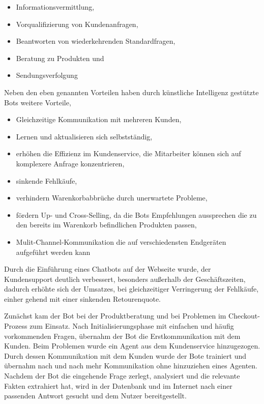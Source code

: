 \begin{itemize}
	\item Informationsvermittlung,
	\item Vorqualifizierung von Kundenanfragen,
	\item Beantworten von wiederkehrenden Standardfragen,
	\item Beratung zu Produkten und
	\item Sendungsverfolgung
\end{itemize} 

Neben den eben genannten Vorteilen haben durch künstliche Intelligenz gestützte Bots weitere Vorteile,

\begin{itemize}
	\item Gleichzeitige Kommunikation mit mehreren Kunden,
	\item Lernen und aktualisieren sich selbstständig,
	\item erhöhen die Effizienz im Kundenservice, die Mitarbeiter können sich auf komplexere Anfrage konzentrieren,
	\item sinkende Fehlkäufe,
	\item verhindern Warenkorbabbrüche durch unerwartete Probleme,
	\item fördern Up- und Cross-Selling, da die Bots Empfehlungen aussprechen die zu den bereits im Warenkorb befindlichen Produkten passen,
	\item Mulit-Channel-Kommunikation die auf verschiedensten Endgeräten aufgeführt werden kann 
\end{itemize}

Durch die Einführung eines Chatbots auf der Webseite wurde, der Kundensupport deutlich verbessert, besonders außerhalb der Geschäftszeiten, dadurch erhöhte sich der Umsatzes, bei gleichzeitiger Verringerung der Fehlkäufe, einher gehend mit einer sinkenden Retourenquote.\vspace{0.2cm}

Zunächst kam der Bot bei der Produktberatung und bei Problemen im Checkout-Prozess zum Einsatz. Nach Initialisierungsphase mit einfachen und häufig vorkommenden Fragen, übernahm der Bot die Erstkommunikation mit dem Kunden. Beim Problemen wurde ein Agent aus dem Kundenservice hinzugezogen. Durch dessen Kommunikation mit dem Kunden wurde der Bote trainiert und übernahm nach und nach mehr Kommunikation ohne hinzuziehen eines Agenten. Nachdem der Bot die eingehende Frage zerlegt, analysiert und die relevante Fakten extrahiert hat, wird in der Datenbank und im Internet nach einer passenden Antwort gesucht und dem Nutzer bereitgestellt.\vspace{0.2cm}

